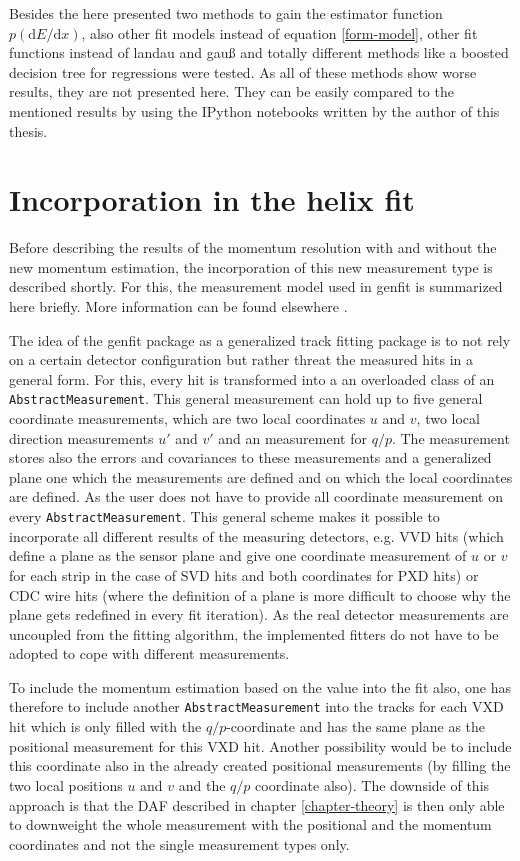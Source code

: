 Besides the here presented two methods to gain the estimator function $p(\mathrm dE/\mathrm dx)$, also other fit models instead of equation \ref{form-model}, other fit functions instead of landau and gauß and totally different methods like a boosted decision tree for regressions were tested. As all of these methods show worse results, they are not presented here. They can be easily compared to the mentioned results by using the IPython notebooks written by the author of this thesis.

\section{Incorporation in the helix fit}

Before describing the results of the momentum resolution with and without the new momentum estimation, the incorporation of this new measurement type is described shortly. For this, the measurement model used in genfit is summarized here briefly. More information can be found elsewhere \cite{genfit}.

The idea of the genfit package as a generalized track fitting package is to not rely on a certain detector configuration but rather threat the measured hits in a general form. For this, every hit is transformed into a an overloaded class of an \texttt{AbstractMeasurement}. This general measurement can hold up to five general coordinate measurements, which are two local coordinates $u$ and $v$, two local direction measurements $u'$ and $v'$ and an measurement for $q/p$. The measurement stores also the errors and covariances to these measurements and a generalized plane one which the measurements are defined and on which the local coordinates are defined. As the user does not have to provide all coordinate measurement on every \texttt{AbstractMeasurement}. This general scheme makes it possible to incorporate all different results of the measuring detectors, e.g. VVD hits (which define a plane as the sensor plane and give one coordinate measurement of $u$ or $v$ for each strip in the case of SVD hits and both coordinates for PXD hits) or CDC wire hits (where the definition of a plane is more difficult to choose why the plane gets redefined in every fit iteration). As the real detector measurements are uncoupled from the fitting algorithm, the implemented fitters do not have to be adopted to cope with different measurements.

To include the momentum estimation based on the \dedx value into the fit also, one has therefore to include another \texttt{AbstractMeasurement} into the tracks for each VXD hit which is only filled with the $q/p$-coordinate and has the same plane as the positional measurement for this VXD hit. Another possibility would be to include this coordinate also in the already created positional measurements (by filling the two local positions $u$ and $v$ and the $q/p$ coordinate also). The downside of this approach is that the DAF described in chapter \ref{chapter-theory} is then only able to downweight the whole measurement with the positional and the momentum coordinates and not the single measurement types only.

